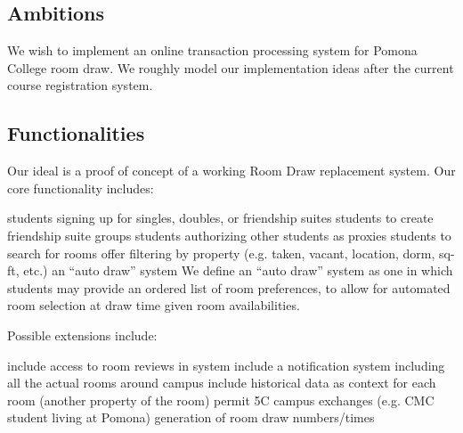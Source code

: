 \subsection{Ambitions}

We wish to implement an online transaction processing system for Pomona College
room draw. We roughly model our implementation ideas after the current course
registration system.

\subsection{Functionalities}

Our ideal is a proof of concept of a working Room Draw replacement system. Our
core functionality includes:

\begin{outline}
\1 students signing up for singles, doubles, or friendship suites
\1 students to create friendship suite groups
\1 students authorizing other students as proxies
\1 students to search for rooms
    \2 offer filtering by property (e.g. taken, vacant, location, dorm, sq-ft,
    etc.)
\1 an ``auto draw'' system
    \2 We define an ``auto draw'' system as one in which students may provide an
    ordered list of room preferences, to allow for automated room selection at
    draw time given room availabilities.
\end{outline}

Possible extensions include:

\begin{outline}
\1 include access to room reviews in system
\1 include a notification system
\1 including all the actual rooms around campus
\1 include historical data as context for each room (another property of the
    room)
\1 permit 5C campus exchanges (e.g. CMC student living at Pomona)
\1 generation of room draw numbers/times
\end{outline}